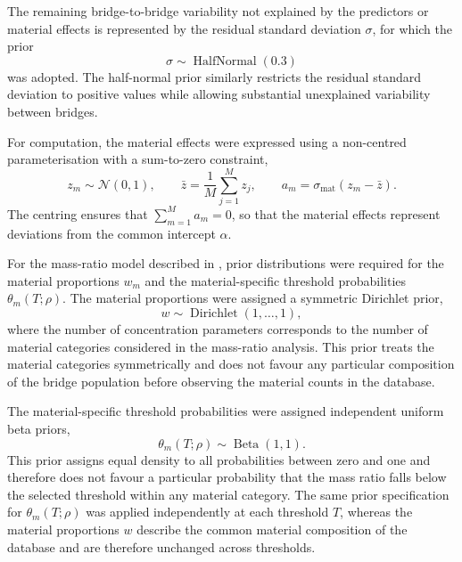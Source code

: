 \documentclass[preprint,a4paper,12pt]{elsarticle}
\begin{document}
The remaining bridge-to-bridge variability not explained by the predictors
or material effects is represented by the residual standard deviation
$\sigma$, for which the prior
\begin{equation}
    \sigma \sim \operatorname{HalfNormal}(0.3)
\end{equation}
was adopted.
The half-normal prior similarly restricts the residual standard deviation to positive values while allowing substantial unexplained variability between bridges.

For computation, the material effects were expressed using a non-centred parameterisation with a sum-to-zero constraint,
\begin{equation}
    z_m \sim \mathcal{N}(0,1),
    \qquad
    \bar z = \frac{1}{M}\sum_{j=1}^{M} z_j,
    \qquad
    a_m
    =
    \sigma_{\mathrm{mat}}
    \left(z_m-\bar z\right).
\end{equation}
The centring ensures that $\sum_{m=1}^{M} a_m = 0$, so that the material effects represent deviations from the common intercept $\alpha$.

For the mass-ratio model described in , prior distributions were required for the material proportions $w_m$ and the material-specific threshold probabilities $\theta_m(T;\rho)$.
The material proportions were assigned a symmetric Dirichlet prior,
\begin{equation}
    w
    \sim
    \operatorname{Dirichlet}(1,\ldots,1),
\end{equation}
where the number of concentration parameters corresponds to the number of material categories considered in the mass-ratio analysis.
This prior treats the material categories symmetrically and does not favour any particular composition of the bridge population before observing the material counts in the database.

The material-specific threshold probabilities were assigned independent uniform beta priors,
\begin{equation}
    \theta_m(T;\rho)
    \sim
    \operatorname{Beta}(1,1).
\end{equation}
This prior assigns equal density to all probabilities between zero and one and therefore does not favour a particular probability that the mass ratio falls below the selected threshold within any material category.
The same prior specification for $\theta_m(T;\rho)$ was applied independently at each threshold $T$, whereas the material proportions $w$ describe the common material composition of the database and are therefore unchanged across thresholds.
\end{document}
